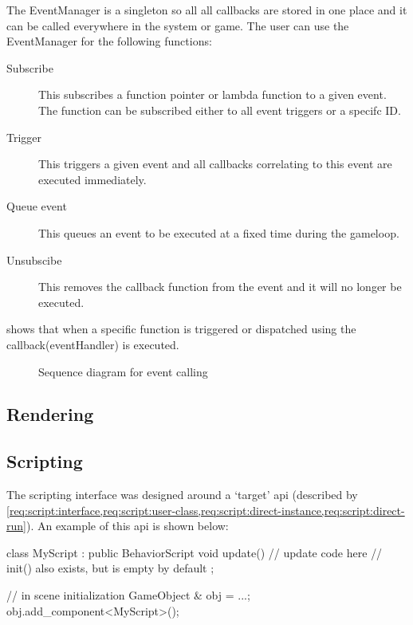 \documentclass{projdoc}
\begin{document}
The EventManager is a singleton so all all callbacks are stored in one place and it
can be called everywhere in the system or game. The user can use the EventManager for
the following functions:\noparbreak
\begin{description}
	\item[Subscribe] This subscribes a function pointer or lambda function to a given
		event. The function can be subscribed either to all event triggers or a specifc
		ID.
	\item[Trigger] This triggers a given event and all callbacks correlating to this
		event are executed immediately.
	\item[Queue event] This queues an event to be executed at a fixed time during the
		gameloop.
	\item[Unsubscibe] This removes the callback function from the event and it will no
		longer be executed.
\end{description}

 shows that when a specific function is triggered or dispatched
using the callback(eventHandler) is executed.

\begin{figure}
	\centering
	\caption{Sequence diagram for event calling}
	\label{fig:event-seq}
\end{figure}


\subsection{Rendering}

\subsection{Scripting}

The scripting interface was designed around a `target' \gls{api} (described by
\cref{req:script:interface,req:script:user-class,req:script:direct-instance,req:script:direct-run}).
An example of this \gls{api} is shown below:\noparbreak

\begin{blockcode}
class MyScript : public BehaviorScript {
	void update() {
		// update code here
	}
	// init() also exists, but is empty by default
};

{ // in scene initialization
	GameObject & obj = ...;
	obj.add_component<MyScript>();
}
\end{blockcode}
\end{document}
